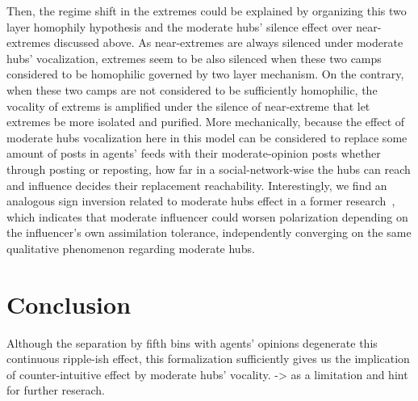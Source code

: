 \documentclass{svproc}
\begin{document}
Then, the regime shift in the extremes could be 
explained by organizing this two layer 
homophily hypothesis and 
the moderate hubs' silence effect over near-extremes discussed above. 
As near-extremes are always silenced under moderate hubs' vocalization, 
extremes seem to be also silenced when these two camps 
considered to be homophilic governed by two layer 
mechanism. 
On the contrary, when these two camps are not considered 
to be sufficiently homophilic, 
the vocality of extrems is amplified under the silence of 
near-extreme that let extremes be more isolated and purified. 
More mechanically, because the effect of moderate hubs 
vocalization here 
in this model can be considered to replace some amount of 
posts in agents' feeds with their moderate-opinion posts
whether through posting or reposting, 
how far in a social-network-wise the hubs can reach and influence 
decides their replacement reachability. 
Interestingly, we find an analogous sign inversion related to 
moderate hubs effect in a former research~\cite{betts2023}, 
which indicates 
that moderate influencer could worsen polarization 
depending on the influencer's own assimilation tolerance, 
independently converging on the same qualitative phenomenon 
regarding moderate hubs. 

\section{Conclusion}\label{sec:conclusion}
Although the separation by fifth bins with agents' opinions 
degenerate this continuous ripple-ish effect, this formalization 
sufficiently gives us the implication of counter-intuitive 
effect by moderate hubs' vocality. -> as a limitation and 
hint for further reserach.



\end{document}
